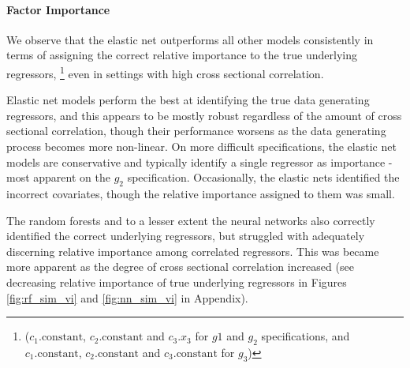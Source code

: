 \documentclass{article}
\begin{document}

\paragraph{Factor Importance}
We observe that the elastic net outperforms all other models consistently in terms of assigning the correct relative importance to the true underlying regressors, \footnote{($c_1.\text{constant}$, $c_2.\text{constant}$ and $c_3.x_3$ for $g1$ and $g_2$ specifications, and $c_1.\text{constant}$, $c_2.\text{constant}$ and $c_3.\text{constant}$ for $g_3$)} even in settings with high cross sectional correlation. 

Elastic net models perform the best at identifying the true data generating regressors, and  this appears to be mostly robust regardless of the amount of cross sectional correlation, though their performance worsens as the data generating process becomes more non-linear. On more difficult specifications, the elastic net models are conservative and typically identify a single regressor as importance - most apparent on the $g_2$ specification. Occasionally, the elastic nets identified the incorrect covariates, though the relative importance assigned to them was small. 

The random forests and to a lesser extent the neural networks also correctly identified the correct underlying regressors, but struggled with adequately discerning relative importance among correlated regressors. This was became more apparent as the degree of cross sectional correlation increased (see decreasing relative importance of true underlying regressors in Figures \ref{fig:rf_sim_vi} and \ref{fig:nn_sim_vi} in Appendix). 

\end{document}
